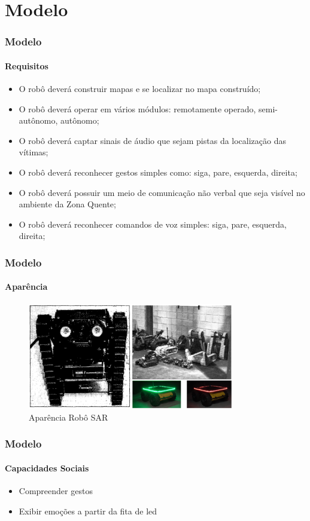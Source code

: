 \documentclass[aspectratio=169]{beamer}
\begin{document}
\section{Modelo}

\begin{frame}
\frametitle{Modelo}
\framesubtitle{Requisitos}
\begin{itemize}
\item O robô deverá construir mapas e se localizar no mapa construído;
\item O robô deverá operar em vários módulos: remotamente operado, semi-autônomo, autônomo;
\item O robô deverá captar sinais de áudio que sejam pistas da localização das vítimas;
\item O robô deverá reconhecer gestos simples como: siga, pare, esquerda, direita;
\item O robô deverá possuir um meio de comunicação não verbal que seja visível no ambiente da Zona Quente;
\item O robô deverá reconhecer comandos de voz simples: siga, pare, esquerda, direita;
\end{itemize}
\end{frame}

\begin{frame}
\frametitle{Modelo}
\framesubtitle{Aparência}
\begin{figure}
  \centering
  \includegraphics[width=0.8\textwidth]{robos-sar.png}
  \caption{Aparência Robô SAR}
\end{figure}


\end{frame}
\begin{frame}
\frametitle{Modelo}
\framesubtitle{Capacidades Sociais}
\begin{itemize}
\item Compreender gestos
\item Exibir emoções a partir da fita de led
\end{itemize}
\end{frame}
\end{document}
